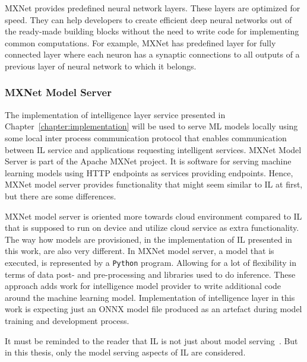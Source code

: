 \documentclass[english, 12pt, a4paper, elec, utf8, online]{aaltothesis}
\begin{document}
MXNet provides predefined neural network layers. These layers are optimized for speed.
They can help developers to create efficient deep neural networks out of the ready-made building blocks without the need to write code for implementing common computations. For example, MXNet has predefined layer for fully connected layer where each neuron has a synaptic connections to all outputs of a previous layer of neural network to which it belongs.



\subsubsection{MXNet Model Server}
The implementation of intelligence layer service presented in Chapter~\ref{chapter:implementation} will be used to serve ML models locally using some local inter process communication protocol that enables communication between IL service and applications requesting intelligent services. MXNet Model Server is part of the Apache MXNet project. It is software for serving machine learning models using HTTP endpoints as services providing endpoints. Hence, MXNet model server provides functionality that might seem similar to IL at first, but there are some differences.

MXNet model server is oriented more towards cloud environment compared to IL that is supposed to run on device and utilize cloud service as extra functionality. The way how models are provisioned, in the implementation of IL presented in this work, are also very different. In MXNet model server, a model that is executed, is represented by a \texttt{Python} program. Allowing for a lot of flexibility in terms of data post- and pre-processing and libraries used to do inference. These approach adds work for intelligence model provider to write additional code around the machine learning model. Implementation of intelligence layer in this work is expecting just an ONNX model file produced as an artefact during model training and development process.            

It must be reminded to the reader that IL is not just about model serving~\cite{edgar2019}. But in this thesis, only the model serving aspects of IL are considered.  
\end{document}
